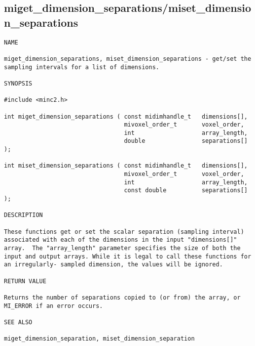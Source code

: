 \documentclass{article}
\begin{document}
\subsection{miget\_dimension\_separations/miset\_dimension\_separations}
\begin{verbatim}
NAME

miget_dimension_separations, miset_dimension_separations - get/set the
sampling intervals for a list of dimensions.

SYNOPSIS

#include <minc2.h>

int miget_dimension_separations ( const midimhandle_t   dimensions[],
                                  mivoxel_order_t       voxel_order,
                                  int                   array_length,
                                  double                separations[] );

int miset_dimension_separations ( const midimhandle_t   dimensions[],
                                  mivoxel_order_t       voxel_order,
                                  int                   array_length,
                                  const double          separations[] );

DESCRIPTION

These functions get or set the scalar separation (sampling interval)
associated with each of the dimensions in the input "dimensions[]"
array.  The "array_length" parameter specifies the size of both the
input and output arrays. While it is legal to call these functions for
an irregularly- sampled dimension, the values will be ignored.

RETURN VALUE

Returns the number of separations copied to (or from) the array, or
MI_ERROR if an error occurs.

SEE ALSO

miget_dimension_separation, miset_dimension_separation
\end{verbatim}
\end{document}
